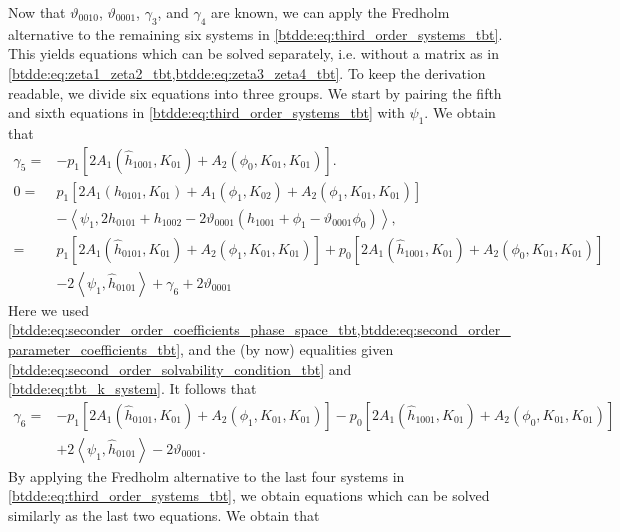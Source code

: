 Now that $\vartheta_{0010}$, $\vartheta_{0001}$, $\gamma_3$, and $\gamma_4$ are
known, we can apply the Fredholm alternative to the remaining six systems in
\cref{btdde:eq:third_order_systems_tbt}. This yields equations which can be solved
separately, i.e. without a matrix as in
\cref{btdde:eq:zeta1_zeta2_tbt,btdde:eq:zeta3_zeta4_tbt}. To keep the derivation readable,
we divide six equations into three groups. We start by pairing the fifth and
sixth equations in \cref{btdde:eq:third_order_systems_tbt} with $\psi_1$. We obtain that 
\begin{align*}
\gamma_5 ={}& -p_1\left[2 A_1(\hat h_{1001}, K_{01}) + A_2(\phi_0,K_{01},K_{01})\right]. \\
0 ={}& p_1 \left[2 A_1(h_{0101},K_{01}) + A_1(\phi_1,K_{02}) + A_2(\phi_1,K_{01},K_{01})\right] \\
     & -\left< \psi_1, 2 h_{0101} + h_{1002} - 2 \vartheta_{0001} (h_{1001} + \phi_1 - \vartheta_{0001} \phi_0) \right>, \\
  ={}& p_1 \left[2 A_1(\hat h_{0101},K_{01}) + A_2(\phi_1,K_{01},K_{01})\right]  
     + p_0 \left[2 A_1(\hat h_{1001},K_{01})+ A_2(\phi_0,K_{01},K_{01})\right] \\
     & -2 \left< \psi_1, \hat h_{0101} \right> + \gamma_6 + 2 \vartheta_{0001}
\end{align*}
Here we used
\cref{btdde:eq:seconder_order_coefficients_phase_space_tbt,btdde:eq:second_order_parameter_coefficients_tbt},
and the (by now) equalities given \cref{btdde:eq:second_order_solvability_condition_tbt} and 
\cref{btdde:eq:tbt_k_system}. It follows that 
\begin{equation}
\begin{aligned}
\gamma_6 ={}& -p_1 \left[2 A_1(\hat h_{0101},K_{01}) + A_2(\phi_1,K_{01},K_{01})\right]  
              - p_0 \left[2 A_1(\hat h_{1001},K_{01})+ A_2(\phi_0,K_{01},K_{01})\right] \\
            & +2 \left< \psi_1, \hat h_{0101} \right> - 2 \vartheta_{0001}. \nonumber
\end{aligned}
\end{equation}
%
By applying the Fredholm alternative to the last four systems in
\cref{btdde:eq:third_order_systems_tbt}, we obtain equations which can be solved 
similarly as the last two equations. We obtain that
